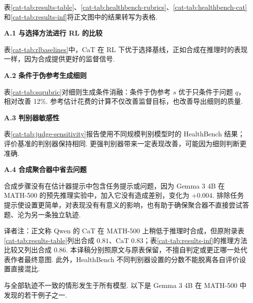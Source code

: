 表\ref{cat-tab:results-table}、\ref{cat-tab:healthbench-rubrics}、\ref{cat-tab:healthbench-cat}和\ref{cat-tab:results-inf}将正文图中的结果转写为表格.





\noindent\textbf{A.1 与选择方法进行 RL 的比较}\label{cat-app:rlcomp}\par
表\ref{cat-tab:rlbaselines}中，CaT 在 RL 下优于选择基线，正如合成在推理时的表现一样，因为合成提供更好的监督信号.


\noindent\textbf{A.2 条件于伪参考生成细则}\label{cat-app:pseudoref}\par
表\ref{cat-tab:sqrubric}对细则生成条件消融：条件于伪参考 $s$ 优于只条件于问题 $q$，相对改善 12\%. 参考估计花费的计算不仅改善监督目标，也改善导出细则的质量.


\noindent\textbf{A.3 判别器敏感性}\label{cat-app:judge-sens}\par
表\ref{cat-tab:judge-sensitivity}报告使用不同规模判别模型时的 HealthBench 结果；评价基准的判别器保持相同. 更强判别器带来一定表现改善，可能因为细则判断更准确.


\noindent\textbf{A.4 合成聚合器中省去问题}\label{cat-app:omittingq}\par
合成步骤没有在估计器提示中包含任务提示或问题，因为 Gemma 3 4B 在 MATH-500 的预先推理实验中，加入它没有造成差别，变化为 $+0.004$. 排除任务提示使设置更简单，对表现没有有意义的影响，也有助于确保聚合器不直接尝试答题、沦为另一条独立轨迹.

\begin{remark}
译者注：正文称 Qwen 的 CaT 在 MATH-500 上稍低于推理时合成，但原附录表\ref{cat-tab:results-table}列出合成 $0.81$、CaT $0.83$；表\ref{cat-tab:results-inf}的推理方法比较又列出合成 $0.86$. 本译稿分别照原文与原表保留，不擅自判定或更正哪一处代表作者最终意图. 此外，HealthBench 不同判别器设置的分数不能脱离各自评价设置直接混比.
\end{remark}

与全部轨迹不一致的情形发生于所有模型. 以下是 Gemma 3 4B 在 MATH-500 中发现的若干例子之一.

